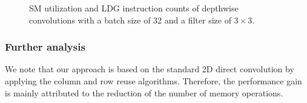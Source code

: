 \begin{figure}
    \centering
    \qquad
    \vspace{5mm}
    \vspace{-4mm}
    \caption{SM utilization and LDG instruction counts of depthwise convolutions with a batch size of 32 and a filter size of $3\times3$.}
    \label{fig:dwratio}
\end{figure}

\subsubsection{Further analysis}
We note that our approach is based on the standard 2D direct convolution by applying the column and row reuse algorithms. 
Therefore, the performance gain is mainly attributed to the reduction of the number of memory operations. 

